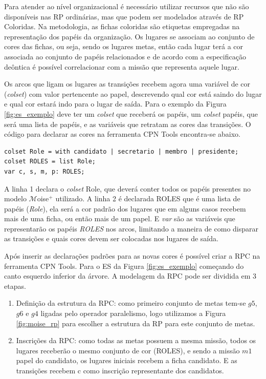 Para atender ao nível organizacional é necessário utilizar recursos que não são disponíveis nas RP ordinárias, mas que podem ser modelados através de RP Coloridas. Na metodologia, as fichas coloridas são etiquetas empregadas na representação  dos papéis da organização. Os lugares se associam ao conjunto de cores das fichas, ou seja, sendo os lugares metas, então cada lugar terá a cor associada ao conjunto de papéis relacionados e de acordo com a especificação deôntica é possível correlacionar com a missão que representa aquele lugar.

Os arcos que ligam os lugares as transições recebem agora uma variável de cor (\textit{colset}) com valor pertencente ao papel, descrevendo qual cor está saindo do lugar e qual cor estará indo para o lugar de saída. Para o exemplo da Figura \ref{fig:es_exemplo} deve  ter um \textit{colset} que receberá os papéis, um \textit{colset} papéis, que será uma lista de papéis, e as variáveis que retratam as cores das transições. O código para declarar as cores na ferramenta CPN Tools encontra-se abaixo.

\begin{lstlisting}
colset Role = with candidato | secretario | membro | presidente;
colset ROLES = list Role;
var c, s, m, p: ROLES;
\end{lstlisting}

A linha 1 declara o \textit{colset} Role, que deverá conter todos os papéis presentes no modelo $\mathcal{M}$oise$^{+}$ utilizado.  A linha 2 é declarada ROLES que é uma lista de papéis (\textit{Role}), ela será a cor padrão dos lugares que em alguns casos recebem mais de uma ficha, ou então mais de um papel. E \textit{var} são as variáveis que representarão os papéis \textit{ROLES} nos arcos, limitando a maneira de como disparar as transições e quais cores devem ser colocadas nos lugares de saída.

Após inserir as declarações padrões para as novas cores é possível criar a RPC na ferramenta CPN Tools. Para o ES da Figura \ref{fig:es_exemplo} começando do canto esquerdo inferior da árvore. A modelagem da RPC pode ser dividida em 3 etapas.

\begin{enumerate}
\item Definição da estrutura da RPC: como primeiro conjunto de metas tem-se $g5$, $g6$ e $g4$ ligadas pelo operador paralelismo, logo utilizamos a Figura \ref{fig:moise_rp} para escolher a estrutura da RP para este conjunto de metas.
\item Inscrições da RPC:  como todas as metas possuem a mesma missão, todos os lugares receberão o mesmo conjunto de cor (ROLES), e sendo a missão $m1$  papel do candidato, os lugares iniciais recebem a ficha candidato. E as transições recebem c como inscrição representante dos candidatos.

\end{enumerate}


